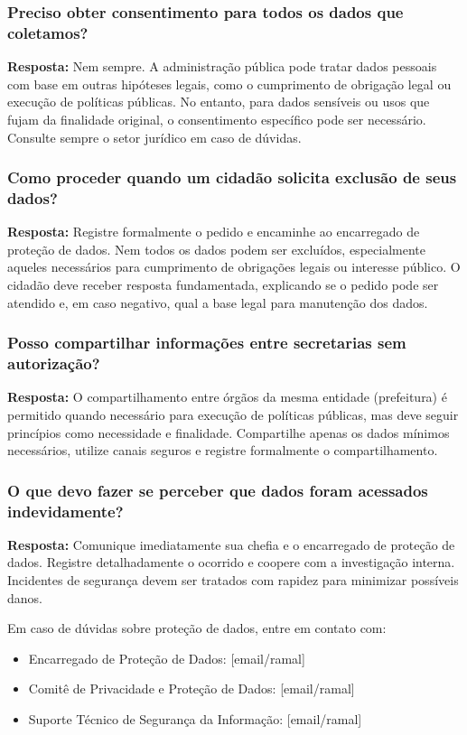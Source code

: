 \documentclass[12pt,a4paper]{article}
\begin{document}
\subsubsection{Preciso obter consentimento para todos os dados que coletamos?}
\textbf{Resposta:} Nem sempre. A administração pública pode tratar dados pessoais com base em outras hipóteses legais, como o cumprimento de obrigação legal ou execução de políticas públicas. No entanto, para dados sensíveis ou usos que fujam da finalidade original, o consentimento específico pode ser necessário. Consulte sempre o setor jurídico em caso de dúvidas.

\subsubsection{Como proceder quando um cidadão solicita exclusão de seus dados?}
\textbf{Resposta:} Registre formalmente o pedido e encaminhe ao encarregado de proteção de dados. Nem todos os dados podem ser excluídos, especialmente aqueles necessários para cumprimento de obrigações legais ou interesse público. O cidadão deve receber resposta fundamentada, explicando se o pedido pode ser atendido e, em caso negativo, qual a base legal para manutenção dos dados.

\subsubsection{Posso compartilhar informações entre secretarias sem autorização?}
\textbf{Resposta:} O compartilhamento entre órgãos da mesma entidade (prefeitura) é permitido quando necessário para execução de políticas públicas, mas deve seguir princípios como necessidade e finalidade. Compartilhe apenas os dados mínimos necessários, utilize canais seguros e registre formalmente o compartilhamento.

\subsubsection{O que devo fazer se perceber que dados foram acessados indevidamente?}
\textbf{Resposta:} Comunique imediatamente sua chefia e o encarregado de proteção de dados. Registre detalhadamente o ocorrido e coopere com a investigação interna. Incidentes de segurança devem ser tratados com rapidez para minimizar possíveis danos.

\begin{tcolorbox}[colback=azulclaro, colframe=blue!75!black, title=Canais de Suporte]
Em caso de dúvidas sobre proteção de dados, entre em contato com:
\begin{itemize}
    \item Encarregado de Proteção de Dados: [email/ramal]
    \item Comitê de Privacidade e Proteção de Dados: [email/ramal]
    \item Suporte Técnico de Segurança da Informação: [email/ramal]
\end{itemize}
\end{tcolorbox}
\end{document}
